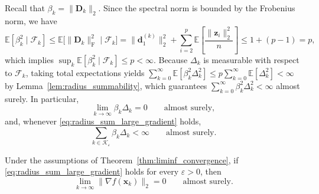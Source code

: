 \documentclass[smallextended]{svjour3}
\newcommand{\bx}{\bm{x}}
\newcommand{\bd}{\bm{d}}
\newcommand{\bz}{\bm{z}}
\begin{document}
Recall that $\beta_k = \|\bm D_k\|_2$. Since the spectral norm is bounded by the Frobenius norm, we have
\[
\mathbb E[\beta_k^2\mid\mathcal F_k] \le \mathbb E\bigl[\|\bm D_k\|_{\mathrm{F}}^2 \;\big|\; \mathcal F_k\bigr] = \|\bd_1^{(k)}\|_2^2 + \sum_{i=2}^p \mathbb E\left[\frac{\|\bz_i\|_2^2}{n}\right] \le 1 + (p-1) = p,
\]
which implies $\sup_k \mathbb E[\beta_k^2\mid\mathcal F_k] \le p < \infty$. Because $\Delta_k$ is measurable with respect to $\mathcal F_k$, taking total expectations yields $\sum_{k=0}^{\infty} \mathbb E[\beta_k^2 \Delta_k^2] \le p \sum_{k=0}^{\infty} \mathbb E[\Delta_k^2] < \infty$ by Lemma~\ref{lem:radius_summability}, which guarantees $\sum_{k=0}^{\infty} \beta_k^2 \Delta_k^2 < \infty$ almost surely. In particular,
\begin{equation}
\label{eq:actual_step_decay}
\lim_{k\to\infty} \beta_k\Delta_k = 0 \qquad \text{almost surely},
\end{equation}
and, whenever \eqref{eq:radius_sum_large_gradient} holds,
\begin{equation}
\label{eq:actual_step_sum}
\sum_{k\in\mathcal K_\varepsilon} \beta_k\Delta_k < \infty \qquad \text{almost surely}.
\end{equation}

\begin{theorem}
\label{thm:global_convergence}
Under the assumptions of Theorem~\ref{thm:liminf_convergence}, if \eqref{eq:radius_sum_large_gradient} holds for every $\varepsilon>0$, then
\begin{equation}
\label{eq:gradient_convergence}
\lim_{k\to\infty} \|\nabla f(\bx_k)\|_2 = 0 \qquad \text{almost surely}.
\end{equation}
\end{theorem}
\end{document}
